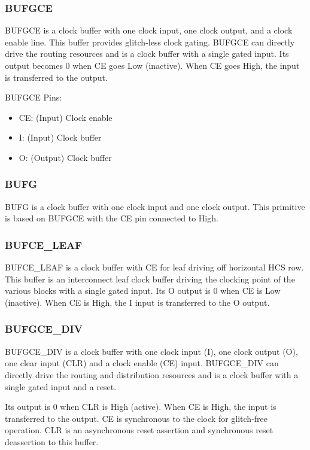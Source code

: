 \documentclass[12pt, a4paper]{report}
\begin{document}
    \subsubsection{BUFGCE}
    BUFGCE is a clock buffer with one clock input, one clock output, and a clock enable line. This buffer provides glitch-less clock gating. BUFGCE can directly drive the routing resources and is a clock buffer with a single gated input. Its output becomes 0 when CE goes Low (inactive). When CE goes High, the input is transferred to the output.

    BUFGCE Pins:
    \begin{itemize}
        \item CE: (Input) Clock enable
        \item I: (Input) Clock buffer
        \item O: (Output) Clock buffer
    \end{itemize}

    \subsubsection{BUFG}
    BUFG is a clock buffer with one clock input and one clock output. This primitive is based on BUFGCE with the CE pin connected to High.

    \subsubsection{BUFCE\_LEAF}
    BUFCE\_LEAF is a clock buffer with CE for leaf driving off horizontal HCS row. This buffer is an interconnect leaf clock buffer driving the clocking point of the various blocks with a single gated input. Its O output is 0 when CE is Low (inactive). When CE is High, the I input is
    transferred to the O output. 

    \subsubsection{BUFGCE\_DIV}
    BUFGCE\_DIV is a clock buffer with one clock input (I), one clock output (O), one clear input (CLR) and a clock enable (CE) input. BUFGCE\_DIV can directly drive the routing and distribution resources and is a clock buffer with a single gated input and a reset. 
    
    Its output is 0 when CLR is High (active). When CE is High, the input is transferred to the output. CE is synchronous to the clock for glitch-free operation. CLR is an asynchronous reset assertion and synchronous reset deassertion to this buffer.     
    
\end{document}
